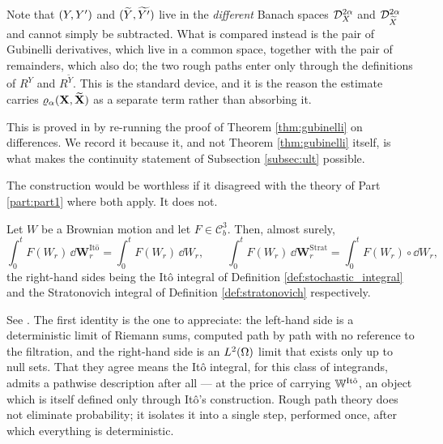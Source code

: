 Note that  $(Y,Y')$ and
$(\widetilde Y,\widetilde{Y'})$ live in the \emph{different} Banach spaces $\mathcal{D}^{2\alpha}_{X}$ and
$\mathcal{D}^{2\alpha}_{\widetilde X}$ and cannot simply be subtracted. What is compared instead is the pair of
Gubinelli derivatives, which live in a common space, together with the pair of remainders, which
also do; the two rough paths enter only through the definitions of $R^Y$ and $R^{\widetilde Y}$.
This is the standard device, and it is the reason the estimate carries $\varrho_{\alpha}(\mathbf{X},\widetilde{\mathbf{X}})$
as a separate term rather than absorbing it.

This is proved in \cite[Thm.\ 4.17]{frizhairer2020} by re-running the proof of Theorem
\ref{thm:gubinelli} on differences. We record it because it, and not Theorem \ref{thm:gubinelli}
itself, is what makes the continuity statement of Subsection \ref{subsec:ult} possible.

The construction would be worthless if it disagreed with the theory of Part \ref{part:part1} where
both apply. It does not.

\begin{proposition}[Consistency]\label{prop:consistency}
Let $W$ be a Brownian motion and let $F \in \mathcal{C}^3_b$. Then, almost surely,
\begin{equation}\label{eq:consistency}
\int_0^t F(W_r)\,\dd\mathbf{W}^{\mathrm{It\hat o}}_r = \int_0^t F(W_r)\,\dd W_r,
\qquad
\int_0^t F(W_r)\,\dd\mathbf{W}^{\mathrm{Strat}}_r = \int_0^t F(W_r)\circ \dd W_r,
\end{equation}
the right-hand sides being the Itô integral of Definition \ref{def:stochastic_integral} and the
Stratonovich integral of Definition \ref{def:stratonovich} respectively. \qedopentext
\end{proposition}

See \cite[Ch.\ 5]{frizhairer2020}. The first identity is the one to appreciate: the left-hand side
is a deterministic limit of Riemann sums, computed path by path with no reference to the filtration,
and the right-hand side is an $L^2(\Omega)$ limit that exists only up to null sets. That they agree
means the Itô integral, for this class of integrands, admits a pathwise description after all --- at
the price of carrying $\mathbb{W}^{\mathrm{It\hat o}}$, an object which is itself defined only through
Itô's construction. Rough path theory does not eliminate probability; it isolates it into a single
step, performed once, after which everything is deterministic.



